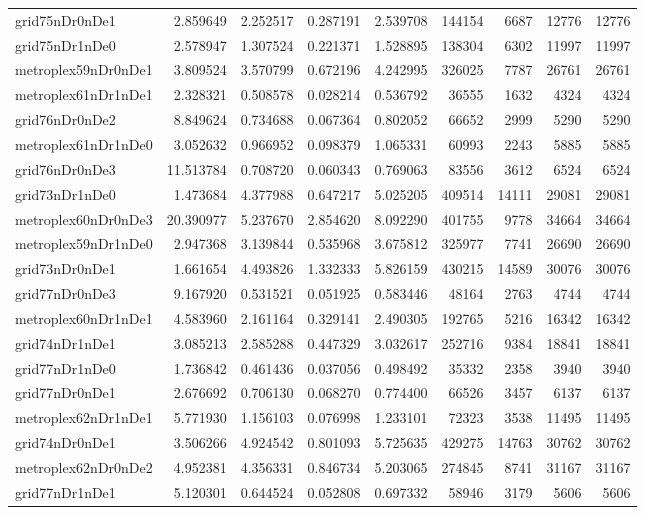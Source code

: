 \begin{longtable}{|l|r|r|r|r|r|r|r|r|}
grid75nDr0nDe1 & 2.859649 & 2.252517 & 0.287191 & 2.539708 & 144154 & 6687 & 12776 & 12776 \\
grid75nDr1nDe0 & 2.578947 & 1.307524 & 0.221371 & 1.528895 & 138304 & 6302 & 11997 & 11997 \\
metroplex59nDr0nDe1 & 3.809524 & 3.570799 & 0.672196 & 4.242995 & 326025 & 7787 & 26761 & 26761 \\
metroplex61nDr1nDe1 & 2.328321 & 0.508578 & 0.028214 & 0.536792 & 36555 & 1632 & 4324 & 4324 \\
grid76nDr0nDe2 & 8.849624 & 0.734688 & 0.067364 & 0.802052 & 66652 & 2999 & 5290 & 5290 \\
metroplex61nDr1nDe0 & 3.052632 & 0.966952 & 0.098379 & 1.065331 & 60993 & 2243 & 5885 & 5885 \\
grid76nDr0nDe3 & 11.513784 & 0.708720 & 0.060343 & 0.769063 & 83556 & 3612 & 6524 & 6524 \\
grid73nDr1nDe0 & 1.473684 & 4.377988 & 0.647217 & 5.025205 & 409514 & 14111 & 29081 & 29081 \\
metroplex60nDr0nDe3 & 20.390977 & 5.237670 & 2.854620 & 8.092290 & 401755 & 9778 & 34664 & 34664 \\
metroplex59nDr1nDe0 & 2.947368 & 3.139844 & 0.535968 & 3.675812 & 325977 & 7741 & 26690 & 26690 \\
grid73nDr0nDe1 & 1.661654 & 4.493826 & 1.332333 & 5.826159 & 430215 & 14589 & 30076 & 30076 \\
grid77nDr0nDe3 & 9.167920 & 0.531521 & 0.051925 & 0.583446 & 48164 & 2763 & 4744 & 4744 \\
metroplex60nDr1nDe1 & 4.583960 & 2.161164 & 0.329141 & 2.490305 & 192765 & 5216 & 16342 & 16342 \\
grid74nDr1nDe1 & 3.085213 & 2.585288 & 0.447329 & 3.032617 & 252716 & 9384 & 18841 & 18841 \\
grid77nDr1nDe0 & 1.736842 & 0.461436 & 0.037056 & 0.498492 & 35332 & 2358 & 3940 & 3940 \\
grid77nDr0nDe1 & 2.676692 & 0.706130 & 0.068270 & 0.774400 & 66526 & 3457 & 6137 & 6137 \\
metroplex62nDr1nDe1 & 5.771930 & 1.156103 & 0.076998 & 1.233101 & 72323 & 3538 & 11495 & 11495 \\
grid74nDr0nDe1 & 3.506266 & 4.924542 & 0.801093 & 5.725635 & 429275 & 14763 & 30762 & 30762 \\
metroplex62nDr0nDe2 & 4.952381 & 4.356331 & 0.846734 & 5.203065 & 274845 & 8741 & 31167 & 31167 \\
grid77nDr1nDe1 & 5.120301 & 0.644524 & 0.052808 & 0.697332 & 58946 & 3179 & 5606 & 5606 \\

\end{longtable}
